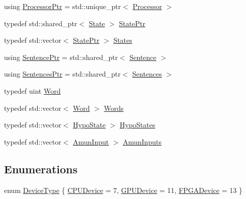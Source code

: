 \begin{DoxyCompactItemize}
\item 
using \hyperlink{namespaceamunmt_a2ff87af5187af8bbedac18dd10c48162}{Processor\+Ptr} = std\+::unique\+\_\+ptr$<$ \hyperlink{classamunmt_1_1Processor}{Processor} $>$
\item 
typedef std\+::shared\+\_\+ptr$<$ \hyperlink{classamunmt_1_1State}{State} $>$ \hyperlink{namespaceamunmt_a1ea9a0b24d777d2c8dc94c4189c6c359}{State\+Ptr}
\item 
typedef std\+::vector$<$ \hyperlink{namespaceamunmt_a1ea9a0b24d777d2c8dc94c4189c6c359}{State\+Ptr} $>$ \hyperlink{namespaceamunmt_a4fe2912e208820f8217fbcf229ebacf7}{States}
\item 
using \hyperlink{namespaceamunmt_a79f0566b0c1ac270d350b2912a3be4a4}{Sentence\+Ptr} = std\+::shared\+\_\+ptr$<$ \hyperlink{classamunmt_1_1Sentence}{Sentence} $>$
\item 
using \hyperlink{namespaceamunmt_a06c5762b84aba68e6c69fb409e57829e}{Sentences\+Ptr} = std\+::shared\+\_\+ptr$<$ \hyperlink{classamunmt_1_1Sentences}{Sentences} $>$
\item 
typedef uint \hyperlink{namespaceamunmt_a07c85682e789f72cc2fbbc3caf7d3800}{Word}
\item 
typedef std\+::vector$<$ \hyperlink{namespaceamunmt_a07c85682e789f72cc2fbbc3caf7d3800}{Word} $>$ \hyperlink{namespaceamunmt_aa50d0b3a5ba58ba5da8a4d88ddab1b18}{Words}
\item 
typedef std\+::vector$<$ \hyperlink{structamunmt_1_1HypoState}{Hypo\+State} $>$ \hyperlink{namespaceamunmt_acca30714a48f384cccf36370d6869b40}{Hypo\+States}
\item 
typedef std\+::vector$<$ \hyperlink{structamunmt_1_1AmunInput}{Amun\+Input} $>$ \hyperlink{namespaceamunmt_a5a9307eef76c887cbe1a67e780437eae}{Amun\+Inputs}
\end{DoxyCompactItemize}
\subsection*{Enumerations}
\begin{DoxyCompactItemize}
\item 
enum \hyperlink{namespaceamunmt_a0f0dad0deb73c5a4c574d8c63833ab17}{Device\+Type} \{ \hyperlink{namespaceamunmt_a0f0dad0deb73c5a4c574d8c63833ab17aafe1036ae66e30a8f082bda43072162a}{C\+P\+U\+Device} = 7, 
\hyperlink{namespaceamunmt_a0f0dad0deb73c5a4c574d8c63833ab17a2ff3f7952956ae21ddcfa3564fe4de5f}{G\+P\+U\+Device} = 11, 
\hyperlink{namespaceamunmt_a0f0dad0deb73c5a4c574d8c63833ab17a1fd21d75952419f8b1ab988f28f747fc}{F\+P\+G\+A\+Device} = 13
 \}
\end{DoxyCompactItemize}
